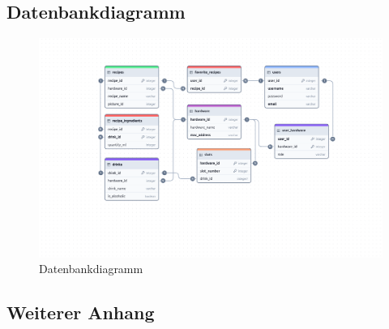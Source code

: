 \newpage



\newpage
\subsection{Datenbankdiagramm}

\begin{figure}[H]
  \centering
\includegraphics[height=0.9\textwidth, angle=90]{graphics/schemes/postgres_db_scheme.png}
  \caption{Datenbankdiagramm}
  \label{fig:database_diagram}
\end{figure}

\newpage

\subsection{Weiterer Anhang}

